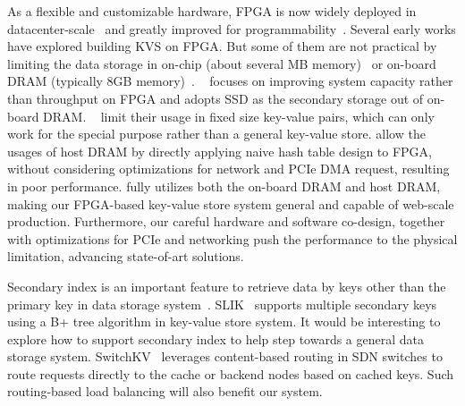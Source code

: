 As a flexible and customizable hardware, FPGA is now widely deployed in datacenter-scale~\cite{putnam2014reconfigurable, caulfield2016cloud} and greatly improved for programmability~\cite{bacon2013fpga,li2016clicknp}. Several early works have explored building KVS on FPGA. But some of them are not practical by limiting the data storage in on-chip (about several MB memory)~\cite{liang16fpl} or on-board DRAM (typically 8GB memory)~\cite{istvan2013flexible,chalamalasetti2013fpga,istvan2015hash}.
~\cite{blott2015scaling} focuses on improving system capacity rather than throughput on FPGA and adopts SSD as the secondary storage out of on-board DRAM.
~\cite{liang16fpl, chalamalasetti2013fpga} limit their usage in fixed size key-value pairs, which can only work for the special purpose rather than a general key-value store.
\cite{blott13hotcloud, lavasani2014fpga} allow the usages of host DRAM by directly applying naive hash table design to FPGA, without considering optimizations for network and PCIe DMA request, resulting in poor performance.
\oursys{} fully utilizes both the on-board DRAM and host DRAM, making our FPGA-based key-value store system general and capable of web-scale production. Furthermore, our careful hardware and software co-design, together with optimizations for PCIe and networking push the performance to the physical limitation, advancing state-of-art solutions.

Secondary index is an important feature to retrieve data by keys other
than the primary key in data storage system~\cite{escriva2012hyperdex, kejriwal2016slik}. SLIK~\cite{kejriwal2016slik} supports multiple secondary keys using a B+ tree algorithm in key-value store system. It would be interesting to explore how to support secondary index to help \oursys{} step towards a general data storage system. SwitchKV~\cite{li2016fast} leverages content-based routing in SDN switches to route requests directly to the cache or backend nodes based on cached keys. Such routing-based load balancing will also benefit our system.









